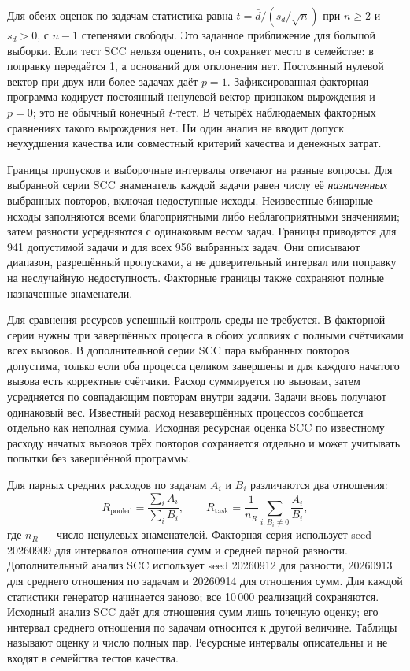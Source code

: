 Для обеих оценок по задачам статистика равна $t=\bar d/(s_d/\sqrt n)$ при $n\geq2$ и $s_d>0$, с $n-1$ степенями свободы. Это заданное приближение для большой выборки. Если тест SCC нельзя оценить, он сохраняет место в семействе: в поправку передаётся 1, а оснований для отклонения нет. Постоянный нулевой вектор при двух или более задачах даёт $p=1$. Зафиксированная факторная программа кодирует постоянный ненулевой вектор признаком вырождения и $p=0$; это не обычный конечный $t$-тест. В четырёх наблюдаемых факторных сравнениях такого вырождения нет. Ни один анализ не вводит допуск неухудшения качества или совместный критерий качества и денежных затрат.

Границы пропусков и выборочные интервалы отвечают на разные вопросы. Для выбранной серии SCC знаменатель каждой задачи равен числу её \emph{назначенных} выбранных повторов, включая недоступные исходы. Неизвестные бинарные исходы заполняются всеми благоприятными либо неблагоприятными значениями; затем разности усредняются с одинаковым весом задач. Границы приводятся для 941 допустимой задачи и для всех 956 выбранных задач. Они описывают диапазон, разрешённый пропусками, а не доверительный интервал или поправку на неслучайную недоступность. Факторные границы также сохраняют полные назначенные знаменатели.

Для сравнения ресурсов успешный контроль среды не требуется. В факторной серии нужны три завершённых процесса в обоих условиях с полными счётчиками всех вызовов. В дополнительной серии SCC пара выбранных повторов допустима, только если оба процесса целиком завершены и для каждого начатого вызова есть корректные счётчики. Расход суммируется по вызовам, затем усредняется по совпадающим повторам внутри задачи. Задачи вновь получают одинаковый вес. Известный расход незавершённых процессов сообщается отдельно как неполная сумма. Исходная ресурсная оценка SCC по известному расходу начатых вызовов трёх повторов сохраняется отдельно и может учитывать попытки без завершённой программы.

Для парных средних расходов по задачам $A_i$ и $B_i$ различаются два отношения:
\[
R_{\mathrm{pooled}}=\frac{\sum_i A_i}{\sum_i B_i},\qquad
R_{\mathrm{task}}=\frac{1}{n_R}\sum_{i:B_i\ne0}\frac{A_i}{B_i},
\]
где $n_R$ --- число ненулевых знаменателей. Факторная серия использует seed 20260909 для интервалов отношения сумм и средней парной разности. Дополнительный анализ SCC использует seed 20260912 для разности, 20260913 для среднего отношения по задачам и 20260914 для отношения сумм. Для каждой статистики генератор начинается заново; все 10\,000 реализаций сохраняются. Исходный анализ SCC даёт для отношения сумм лишь точечную оценку; его интервал среднего отношения по задачам относится к другой величине. Таблицы называют оценку и число полных пар. Ресурсные интервалы описательны и не входят в семейства тестов качества.

